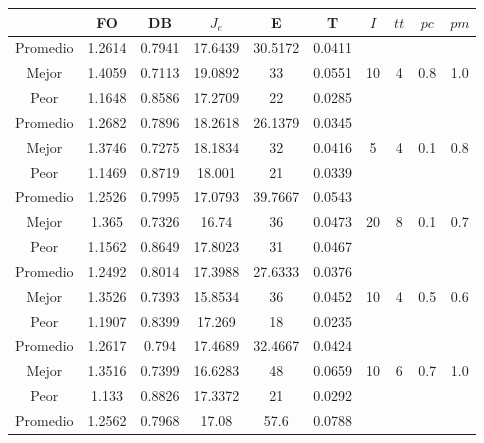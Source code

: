 \begin{table}[h!]
    \footnotesize
    \begin{center}
        \begin{tabular}{|c|c|c|c|c|c|c|c|c|c|}
        \hline
            & {\bf FO} & {\bf DB} & $J_e$ & {\bf E} & {\bf T} & $I$ & $tt$ & $pc$ & $pm$ \\
        \hline
        \hline
            Promedio  & 1.2614 & 0.7941 & 17.6439 & 30.5172 & 0.0411 &  &  &  & \\
            \cline{1-6}
            Mejor & 1.4059 & 0.7113  & 19.0892 & 33 & 0.0551 & 10 & 4 & 0.8 & 1.0\\
            \cline{1-6}
            Peor & 1.1648 & 0.8586  & 17.2709 & 22 & 0.0285 &  &  &  & \\
        \hline
        \hline
            Promedio  & 1.2682 & 0.7896 & 18.2618 & 26.1379 & 0.0345 &  &  &  & \\
            \cline{1-6}
            Mejor & 1.3746 & 0.7275  & 18.1834 & 32 & 0.0416 & 5 & 4 & 0.1 & 0.8\\
            \cline{1-6}
            Peor & 1.1469 & 0.8719  & 18.001 & 21 & 0.0339 &  &  &  & \\
        \hline
        \hline
            Promedio  & 1.2526 & 0.7995 & 17.0793 & 39.7667 & 0.0543 &  &  &  & \\
            \cline{1-6}
            Mejor & 1.365 & 0.7326  & 16.74 & 36 & 0.0473 & 20 & 8 & 0.1 & 0.7\\
            \cline{1-6}
            Peor & 1.1562 & 0.8649  & 17.8023 & 31 & 0.0467 &  &  &  & \\
        \hline
        \hline
            Promedio  & 1.2492 & 0.8014 & 17.3988 & 27.6333 & 0.0376 &  &  &  & \\
            \cline{1-6}
            Mejor & 1.3526 & 0.7393  & 15.8534 & 36 & 0.0452 & 10 & 4 & 0.5 & 0.6\\
            \cline{1-6}
            Peor & 1.1907 & 0.8399  & 17.269 & 18 & 0.0235 &  &  &  & \\
        \hline
        \hline
            Promedio  & 1.2617 & 0.794 & 17.4689 & 32.4667 & 0.0424 &  &  &  & \\
            \cline{1-6}
            Mejor & 1.3516 & 0.7399  & 16.6283 & 48 & 0.0659 & 10 & 6 & 0.7 & 1.0\\
            \cline{1-6}
            Peor & 1.133 & 0.8826  & 17.3372 & 21 & 0.0292 &  &  &  & \\
        \hline
        \hline
            Promedio  & 1.2562 & 0.7968 & 17.08 & 57.6 & 0.0788 &  &  &  & \\

\end{tabular}
\end{center}
\end{table}
